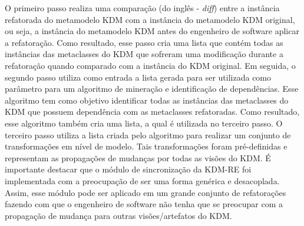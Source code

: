 O primeiro passo realiza uma comparação (do inglês - \textit{diff}) entre a instância refatorada do metamodelo KDM com a instância do metamodelo KDM original, ou seja, a instância do metamodelo KDM antes do engenheiro de software aplicar a refatoração. Como resultado, esse passo cria uma lista que contém todas as instâncias das metaclasses do KDM que sofreram uma modificação durante a refatoração quando comparado com a instância do KDM original. Em seguida, o segundo passo utiliza como entrada a lista gerada para ser utilizada como parâmetro para um algoritmo de mineração e identificação de dependências. Esse algoritmo tem como objetivo identificar todas as instâncias das metaclasses do KDM que possuem dependência com as metaclasses refatoradas. Como resultado, esse algoritmo também cria uma lista, a qual é utilizada no terceiro passo. O terceiro passo utiliza a lista criada pelo algoritmo para realizar um conjunto de transformações em nível de modelo. Tais transformações foram pré-definidas e representam as propagações de mudanças por todas as visões do KDM. É importante destacar que o módulo de sincronização da KDM-RE foi implementada com a preocupação de ser uma forma genérica e desacoplada. Assim, esse módulo pode ser aplicado em um grande conjunto de refatorações fazendo com que o engenheiro de software não tenha que se preocupar com a propagação de mudança para outras visões/artefatos do KDM. 




